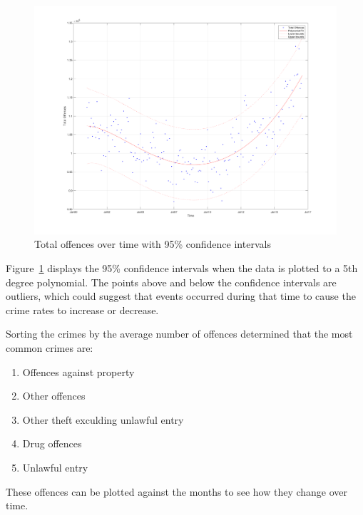 \documentclass[]{article}
\begin{document}
\begin{figure}[H]
    \caption{Total offences over time with 95\% confidence intervals}
    \centering
    \label{fig:crime_confidence}
    \includegraphics[width=\linewidth]{../images/crime_over_time_confidence}
\end{figure}

Figure~\ref{fig:crime_confidence} displays the 95\% confidence intervals when the data is plotted to a 5th 
degree polynomial.
The points above and below the confidence intervals are outliers, which could suggest that events occurred
during that time to cause the crime rates to increase or decrease.


Sorting the crimes by the average number of offences determined that the most common crimes are:

\begin{enumerate}
    \item Offences against property
    \item Other offences
    \item Other theft exculding unlawful entry
    \item Drug offences
    \item Unlawful entry
\end{enumerate}

These offences can be plotted against the months to see how they change over time.
\end{document}
